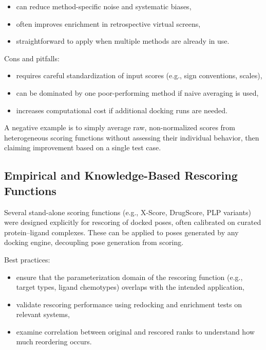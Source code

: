 \documentclass[12pt,a4paper]{article}
\begin{document}
\begin{itemize}
  \item can reduce method-specific noise and systematic biases,
  \item often improves enrichment in retrospective virtual screens,
  \item straightforward to apply when multiple methods are already in use.
\end{itemize}

Cons and pitfalls:

\begin{itemize}
  \item requires careful standardization of input scores (e.g., sign conventions, scales),
  \item can be dominated by one poor-performing method if naive averaging is used,
  \item increases computational cost if additional docking runs are needed.
\end{itemize}

A negative example is to simply average raw, non-normalized scores from heterogeneous scoring functions without assessing their individual behavior, then claiming improvement based on a single test case.

\subsection{Empirical and Knowledge-Based Rescoring Functions}

Several stand-alone scoring functions (e.g., X-Score, DrugScore, PLP variants) were designed explicitly for rescoring of docked poses, often calibrated on curated protein–ligand complexes.\cite{CH8_Cheng2009} These can be applied to poses generated by any docking engine, decoupling pose generation from scoring.

Best practices:

\begin{itemize}
  \item ensure that the parameterization domain of the rescoring function (e.g., target types, ligand chemotypes) overlaps with the intended application,
  \item validate rescoring performance using redocking and enrichment tests on relevant systems,
  \item examine correlation between original and rescored ranks to understand how much reordering occurs.
\end{itemize}
\end{document}
